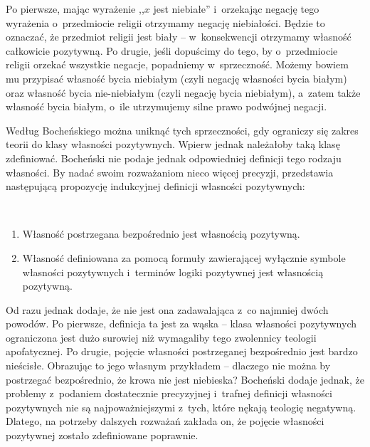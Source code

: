 Po pierwsze, mając wyrażenie ,,$x$ jest niebiałe'' i~orzekając negację tego wyrażenia o~przedmiocie religii otrzymamy negację niebiałości. Będzie to oznaczać, że przedmiot religii jest biały -- w~konsekwencji otrzymamy własność całkowicie pozytywną. Po drugie, jeśli dopuścimy do tego, by o~przedmiocie religii orzekać wszystkie negacje, popadniemy w~sprzeczność. Możemy bowiem mu przypisać własność bycia niebiałym (czyli negację własności bycia białym) oraz własność bycia nie-niebiałym (czyli negację bycia niebiałym), a~zatem także własność bycia białym, o~ile utrzymujemy silne prawo podwójnej negacji.

Według Bocheńskiego można uniknąć tych sprzeczności, gdy ograniczy się zakres teorii do klasy własności pozytywnych. Wpierw jednak należałoby taką klasę zdefiniować. Bocheński nie podaje jednak odpowiedniej definicji tego rodzaju własności. By nadać swoim rozważaniom nieco więcej precyzji, przedstawia następującą propozycję indukcyjnej definicji własności pozytywnych:
\begin{defin}\hfill\ 
\begin{enumerate}%
\item Własność postrzegana bezpośrednio jest własnością pozytywną.
\item Własność definiowana za pomocą formuły zawierającej wyłącznie symbole własności pozytywnych i~terminów logiki pozytywnej jest własnością pozytywną.
\end{enumerate}
\end{defin}
Od razu jednak dodaje, że nie jest ona zadawalająca z~co najmniej dwóch powodów. Po pierwsze, definicja ta jest za wąska -- klasa własności pozytywnych ograniczona jest dużo surowiej niż wymagaliby tego zwolennicy teologii apofatycznej. Po drugie, pojęcie własności postrzeganej bezpośrednio jest bardzo nieścisłe. Obrazując to jego własnym przykładem -- dlaczego nie można by postrzegać bezpośrednio, że krowa nie jest niebieska? Bocheński dodaje jednak, że problemy z~podaniem dostatecznie precyzyjnej i~trafnej definicji własności pozytywnych nie są najpoważniejszymi z~tych, które nękają teologię negatywną. Dlatego, na potrzeby dalszych rozważań zakłada on, że pojęcie własności pozytywnej zostało zdefiniowane poprawnie.

